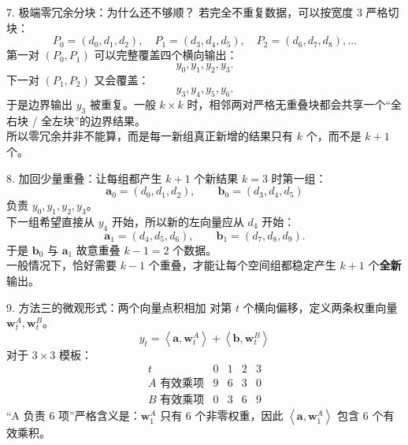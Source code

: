 \documentclass[aspectratio=169,11pt]{beamer}
\newcommand{\dotp}[2]{\left\langle #1,#2\right\rangle}
\begin{document}
\begin{frame}{7. 极端零冗余分块：为什么还不够顺？}
\small
若完全不重复数据，可以按宽度 3 严格切块：
\[
P_0=(d_0,d_1,d_2),\quad P_1=(d_3,d_4,d_5),\quad P_2=(d_6,d_7,d_8),\ldots
\]
第一对 \((P_0,P_1)\) 可以完整覆盖四个横向输出：
\[
y_0,y_1,y_2,y_3.
\]
下一对 \((P_1,P_2)\) 又会覆盖：
\[
y_3,y_4,y_5,y_6.
\]
于是边界输出 \(y_3\) 被重复。一般 \(k\times k\) 时，相邻两对严格无重叠块都会共享一个“全右块 / 全左块”的边界结果。\\[0.7em]
所以零冗余并非不能算，而是每一新组真正新增的结果只有 \(k\) 个，而不是 \(k+1\) 个。
\end{frame}

\begin{frame}{8. 加回少量重叠：让每组都产生 \(k+1\) 个新结果}
\small
\(k=3\) 时第一组：
\[
\bm a_0=(d_0,d_1,d_2),\qquad \bm b_0=(d_3,d_4,d_5)
\]
负责 \(y_0,y_1,y_2,y_3\)。\\[0.6em]
下一组希望直接从 \(y_4\) 开始，所以新的左向量应从 \(d_4\) 开始：
\[
\bm a_1=(d_4,d_5,d_6),\qquad \bm b_1=(d_7,d_8,d_9).
\]
于是 \(\bm b_0\) 与 \(\bm a_1\) 故意重叠 \(k-1=2\) 个数据。\\[0.6em]
一般情况下，恰好需要 \(k-1\) 个重叠，才能让每个空间组都稳定产生 \(k+1\) 个\textbf{全新}输出。
\end{frame}

\begin{frame}{9. 方法三的微观形式：两个向量点积相加}
\small
对第 \(t\) 个横向偏移，定义两条权重向量 \(\bm w_t^A,\bm w_t^B\)。
\[
\boxed{y_t=\dotp{\bm a}{\bm w_t^A}+\dotp{\bm b}{\bm w_t^B}}
\]
对于 \(3\times3\) 模板：
\[
\begin{array}{c|cccc}
 t&0&1&2&3\\\hline
 A\text{ 有效乘项}&9&6&3&0\\
 B\text{ 有效乘项}&0&3&6&9
\end{array}
\]
“A 负责 6 项”严格含义是：\(\bm w_1^A\) 只有 6 个非零权重，因此 \(\dotp{\bm a}{\bm w_1^A}\) 包含 6 个有效乘积。
\end{frame}
\end{document}

